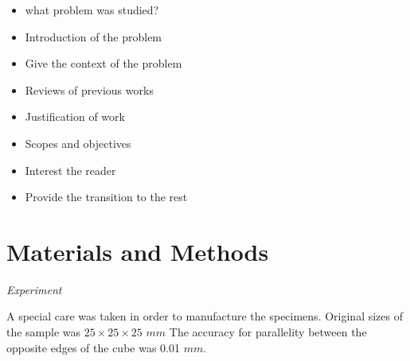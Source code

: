 \documentclass[review]{elsarticle}
\begin{document}
\begin{itemize}
\color{red}  



\item what problem was studied?
\item Introduction of the problem
\item Give the context of the problem
\item Reviews of previous works
\item Justification of work
\item Scopes and objectives
\item Interest the reader
\item Provide the transition to the rest
\end{itemize}

\section{Materials and Methods}

\begin{description}
\item{\textit{Experiment}}
\end{description}

A special care was taken in order to manufacture the specimens. Original sizes
of the sample was $25\times25\times25$ $mm$  The accuracy for parallelity
between the opposite edges of the cube was 0.01 $mm$. 
\end{document}
